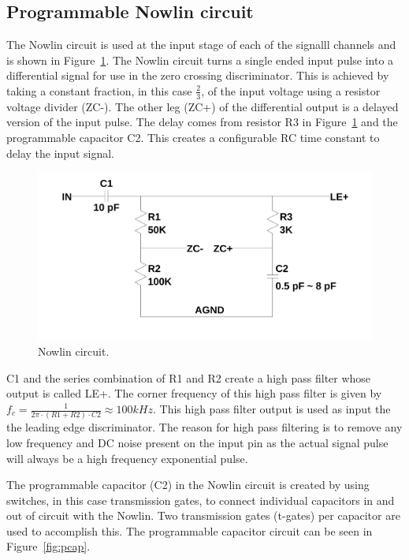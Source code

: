 \documentclass[12pt,oneside,final]{siuethesis}
\theoremstyle{definition}
\begin{document}
\subsection{Programmable Nowlin circuit}
\par The Nowlin circuit is used at the input stage of each of the signalll channels and is shown in Figure~\ref{fig:Nowlin}. The Nowlin circuit turns a single ended input pulse into a differential signal for use in the zero crossing discriminator. This is achieved by taking a constant fraction, in this case $\frac{2}{3}$, of the input voltage using a resistor voltage divider (ZC-). The other leg (ZC+) of the differential output is a delayed version of the input pulse. The delay comes from resistor R3 in Figure~\ref{fig:Nowlin} and the programmable capacitor C2. This creates a configurable RC time constant to delay the input signal. 
\begin{figure}[ht]
\centering
\includegraphics[scale=.3,keepaspectratio=true]{../LTspice_Drawings/nowlin/nowlin.png} 
\caption{Nowlin circuit.}
\label{fig:Nowlin}
\end{figure}
\par C1 and the series combination of R1 and R2 create a high pass filter whose output is called LE+. The corner frequency of this high pass filter is given by $f_{c} = \frac{1}{2\pi \cdot(R1+R2)\cdot C2} \approx 100 kHz$. This high pass filter output is used as input the the leading edge discriminator. The reason for high pass filtering is to remove any low frequency and DC noise present on the input pin as the actual signal pulse will always be a high frequency exponential pulse.
\par The programmable capacitor (C2) in the Nowlin circuit is created by using switches, in this case transmission gates, to connect individual capacitors in and out of circuit with the Nowlin. Two transmission gates (t-gates) per capacitor are used to accomplish this. The programmable capacitor circuit can be seen in Figure~\ref{fig:pcap}.
\end{document}
